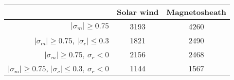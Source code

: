 \begin{tabular}{rcc}
\hline
{} & Solar wind & Magnetosheath \\
\hline
$|\sigma_m|\geq 0.75$                        & 3193 & 4260  \\
$|\sigma_m|\geq 0.75$, $|\sigma_c|\leq 0.3$  & 1821 & 2490  \\
$|\sigma_m|\geq 0.75$, $\sigma_r<0$          & 2156 & 2468  \\
$|\sigma_m|\geq 0.75$, $|\sigma_c|\leq 0.3$, $\sigma_r<0$ & 1144 & 1567 \\
\hline
\end{tabular}


